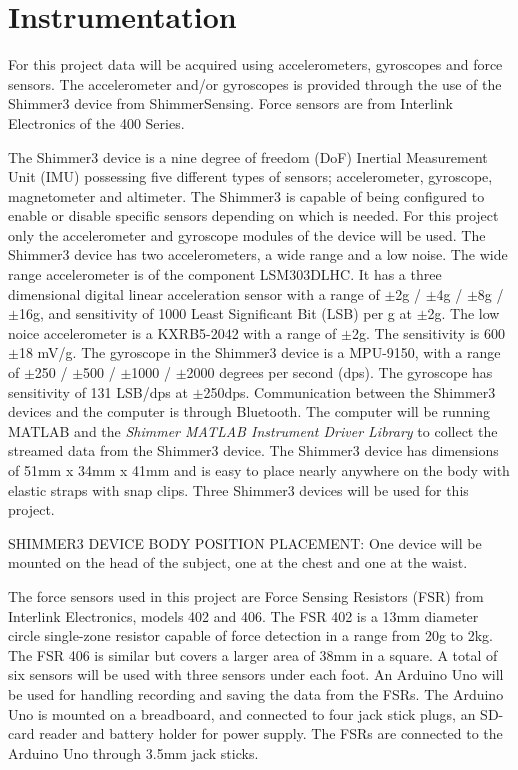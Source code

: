 \section{Instrumentation}

For this project data will be acquired using accelerometers, gyroscopes and force sensors. The accelerometer and/or gyroscopes is provided through the use of the Shimmer3 device from ShimmerSensing. Force sensors are from Interlink Electronics of the 400 Series. %

The Shimmer3 device is a nine degree of freedom (DoF) Inertial Measurement Unit (IMU) possessing five different types of sensors; accelerometer, gyroscope, magnetometer and altimeter. The Shimmer3 is capable of being configured to enable or disable specific sensors depending on which is needed. For this project only the accelerometer and gyroscope modules of the device will be used. The Shimmer3 device has two accelerometers, a wide range and a low noise. The wide range accelerometer is of the component LSM303DLHC. It has a three dimensional digital linear acceleration sensor with a range of $\pm$2g / $\pm$4g / $\pm$8g / $\pm$16g, and sensitivity of 1000 Least Significant Bit (LSB) per g at $\pm$2g. \cite{LSM303DLHC, ShimmerSensing2016} %
The low noice accelerometer is a KXRB5-2042 with a range of $\pm$2g. The sensitivity is 600$\pm$18 mV/g. \cite{ShimmerSensing2016}
The gyroscope in the Shimmer3 device is a MPU-9150, with a range of $\pm$250 / $\pm$500 / $\pm$1000 / $\pm$2000 degrees per second (dps). The gyroscope has sensitivity of 131 LSB/dps at $\pm$250dps. \cite{ShimmerSensing2016}
Communication between the Shimmer3 devices and the computer is through Bluetooth. The computer will be running MATLAB and the \textit{Shimmer MATLAB Instrument Driver Library} to collect the streamed data from the Shimmer3 device. 
The Shimmer3 device has dimensions of 51mm x 34mm x 41mm and is easy to place nearly anywhere on the body with elastic straps with snap clips. Three Shimmer3 devices will be used for this project. 

SHIMMER3 DEVICE BODY POSITION PLACEMENT: One device will be mounted on the head of the subject, one at the chest and one at the waist. 

The force sensors used in this project are Force Sensing Resistors (FSR) from Interlink Electronics, models 402 and 406. The FSR 402 is a 13mm diameter circle single-zone resistor capable of force detection in a range from 20g to 2kg. The FSR 406 is similar but covers a larger area of 38mm in a square. \cite{IE400} A total of six sensors will be used with three sensors under each foot. 
An Arduino Uno will be used for handling recording and saving the data from the FSRs. The Arduino Uno is mounted on a breadboard, and connected to four jack stick plugs, an SD-card reader and battery holder for power supply. The FSRs are connected to the Arduino Uno through 3.5mm jack sticks.

